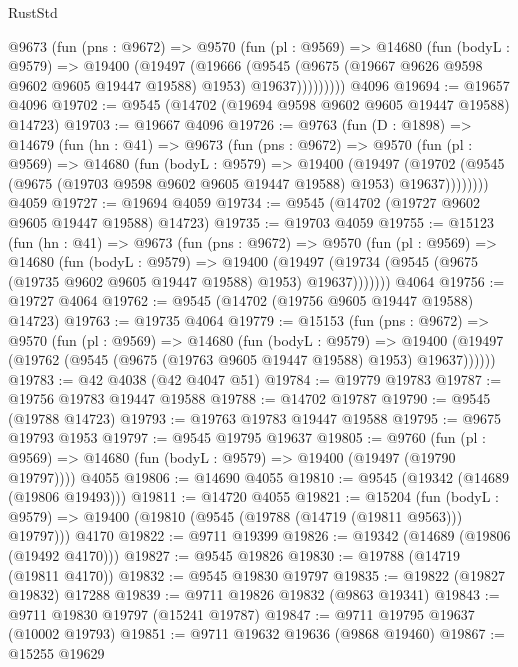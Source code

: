 \begin{lexlean}{RustStd}
\begin{coremodule}
        @9673
          (fun (pns : @9672) =>
          @9570
            (fun (pl : @9569) =>
            @14680
              (fun (bodyL : @9579) =>
              @19400
                (@19497
                  (@19666
                    (@9545
                      (@9675 (@19667 @9626 @9598 @9602 @9605 @19447 @19588) @1953)
                      @19637)))))))))
    @4096
@19694 := @19657 @4096
@19702 := @9545 (@14702 (@19694 @9598 @9602 @9605 @19447 @19588) @14723)
@19703 := @19667 @4096
@19726 := @9763
    (fun (D : @1898) =>
    @14679
      (fun (hn : @41) =>
      @9673
        (fun (pns : @9672) =>
        @9570
          (fun (pl : @9569) =>
          @14680
            (fun (bodyL : @9579) =>
            @19400
              (@19497
                (@19702 (@9545 (@9675 (@19703 @9598 @9602 @9605 @19447 @19588) @1953) @19637))))))))
    @4059
@19727 := @19694 @4059
@19734 := @9545 (@14702 (@19727 @9602 @9605 @19447 @19588) @14723)
@19735 := @19703 @4059
@19755 := @15123
    (fun (hn : @41) =>
    @9673
      (fun (pns : @9672) =>
      @9570
        (fun (pl : @9569) =>
        @14680
          (fun (bodyL : @9579) =>
          @19400
            (@19497 (@19734 (@9545 (@9675 (@19735 @9602 @9605 @19447 @19588) @1953) @19637)))))))
    @4064
@19756 := @19727 @4064
@19762 := @9545 (@14702 (@19756 @9605 @19447 @19588) @14723)
@19763 := @19735 @4064
@19779 := @15153
    (fun (pns : @9672) =>
    @9570
      (fun (pl : @9569) =>
      @14680
        (fun (bodyL : @9579) =>
        @19400 (@19497 (@19762 (@9545 (@9675 (@19763 @9605 @19447 @19588) @1953) @19637))))))
@19783 := @42 @4038 (@42 @4047 @51)
@19784 := @19779 @19783
@19787 := @19756 @19783 @19447 @19588
@19788 := @14702 @19787
@19790 := @9545 (@19788 @14723)
@19793 := @19763 @19783 @19447 @19588
@19795 := @9675 @19793 @1953
@19797 := @9545 @19795 @19637
@19805 := @9760
    (fun (pl : @9569) => @14680 (fun (bodyL : @9579) => @19400 (@19497 (@19790 @19797))))
    @4055
@19806 := @14690 @4055
@19810 := @9545 (@19342 (@14689 (@19806 @19493)))
@19811 := @14720 @4055
@19821 := @15204
    (fun (bodyL : @9579) => @19400 (@19810 (@9545 (@19788 (@14719 (@19811 @9563))) @19797)))
    @4170
@19822 := @9711 @19399
@19826 := @19342 (@14689 (@19806 (@19492 @4170)))
@19827 := @9545 @19826
@19830 := @19788 (@14719 (@19811 @4170))
@19832 := @9545 @19830 @19797
@19835 := @19822 (@19827 @19832) @17288
@19839 := @9711 @19826 @19832 (@9863 @19341)
@19843 := @9711 @19830 @19797 (@15241 @19787)
@19847 := @9711 @19795 @19637 (@10002 @19793)
@19851 := @9711 @19632 @19636 (@9868 @19460)
@19867 := @15255
    @19629

\end{coremodule}
\end{lexlean}
